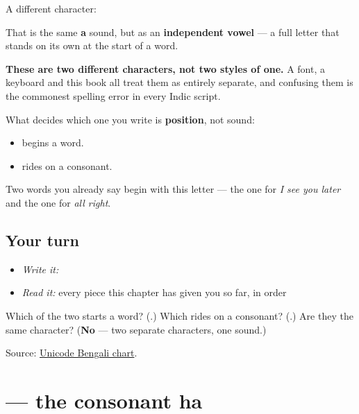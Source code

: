 A different character:

\begin{quote}
\end{quote}

That is the same \textbf{a} sound, but as an \textbf{independent vowel} — a full letter that stands on its own at the start of a word.

\textbf{These are two different characters, not two styles of one.} A font, a keyboard and this book all treat them as entirely separate, and confusing them is the commonest spelling error in every Indic script.

What decides which one you write is \textbf{position}, not sound:

\begin{itemize}
\raggedright
  \item \textbf{} begins a word.
  \item \textbf{} rides on a consonant.
\end{itemize}

Two words you already say begin with this letter — the one for \emph{I see you later} and the one for \emph{all right}.

\subsection*{Your turn}
\begin{itemize}
\raggedright
  \item \emph{Write it:} 
  \item \emph{Read it:} every piece this chapter has given you so far, in order
\end{itemize}

\begin{tcolorbox}[breakable,colback=teal!4,colframe=teal!35!black,title={Before you move on}]
Which of the two starts a word? (\textbf{}.) Which rides on a consonant? (\textbf{}.) Are they the same character? (\textbf{No} — two separate characters, one sound.)

Source: \href{https://www.unicode.org/charts/PDF/U0980.pdf}{Unicode Bengali chart}.
\end{tcolorbox}
\section[hô]{ — the consonant ha}

\label{lesson:BN-W01-ha}



